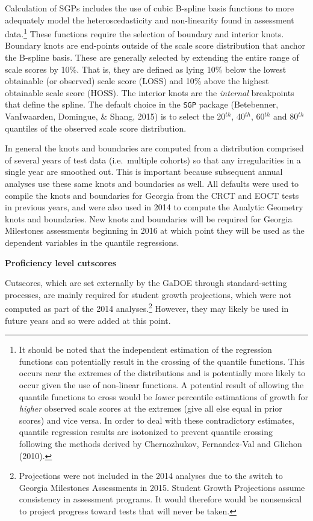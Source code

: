 \documentclass[12pt]{article}
\begin{document}
Calculation of SGPs includes the use of cubic B-spline basis functions
to more adequately model the heteroscedasticity and non-linearity found
in assessment data.\footnote{It should be noted that the independent
  estimation of the regression functions can potentially result in the
  crossing of the quantile functions. This occurs near the extremes of
  the distributions and is potentially more likely to occur given the
  use of non-linear functions. A potential result of allowing the
  quantile functions to cross would be \emph{lower} percentile
  estimations of growth for \emph{higher} observed scale scores at the
  extremes (give all else equal in prior scores) and vice versa. In
  order to deal with these contradictory estimates, quantile regression
  results are isotonized to prevent quantile crossing following the
  methods derived by Chernozhukov, Fernandez-Val and Glichon (2010).}
These functions require the selection of boundary and interior knots.
Boundary knots are end-points outside of the scale score distribution
that anchor the B-spline basis. These are generally selected by
extending the entire range of scale scores by 10\%. That is, they are
defined as lying 10\% below the lowest obtainable (or observed) scale
score (LOSS) and 10\% above the highest obtainable scale score (HOSS).
The interior knots are the \emph{internal} breakpoints that define the
spline. The default choice in the \texttt{SGP} package (Betebenner,
{VanIwaarden}, Domingue, \& Shang, 2015) is to select the 20\(^{th}\),
40\(^{th}\), 60\(^{th}\) and 80\(^{th}\) quantiles of the observed scale
score distribution.

In general the knots and boundaries are computed from a distribution
comprised of several years of test data (i.e.~multiple cohorts) so that
any irregularities in a single year are smoothed out. This is important
because subsequent annual analyses use these same knots and boundaries
as well. All defaults were used to compile the knots and boundaries for
Georgia from the CRCT and EOCT tests in previous years, and were also
used in 2014 to compute the Analytic Geometry knots and boundaries. New
knots and boundaries will be required for Georgia Milestones assessments
beginning in 2016 at which point they will be used as the dependent
variables in the quantile regressions.

\textbf{Proficiency level cutscores}

Cutscores, which are set externally by the GaDOE through
standard-setting processes, are mainly required for student growth
projections, which were not computed as part of the 2014
analyses.\footnote{Projections were not included in the 2014 analyses
  due to the switch to Georgia Milestones Assessments in 2015. Student
  Growth Projections assume consistency in assessment programs. It would
  therefore would be nonsensical to project progress toward tests that
  will never be taken.} However, they may likely be used in future years
and so were added at this point.
\end{document}
